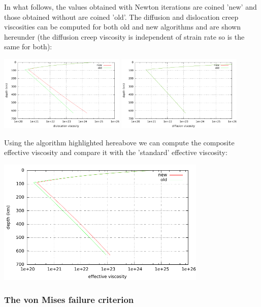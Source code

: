 In what follows, the values obtained with Newton iterations are coined 'new'
and those obtained without are coined 'old'.
The diffusion and dislocation creep viscosities can be
computed for both old and new algorithms and are shown hereunder
(the diffusion creep viscosity is independent of strain rate so
is the same for both):
\begin{center}
\includegraphics[width=6cm]{images/rheology/effvisc/both_mu_ds.pdf}
\includegraphics[width=6cm]{images/rheology/effvisc/both_mu_df.pdf}
\end{center}

Using the algorithm highlighted hereabove we can compute the
composite effective viscosity and compare it with the 'standard'
effective viscosity:
\begin{center}
\includegraphics[width=10cm]{images/rheology/effvisc/both_mueff.pdf}
\end{center}


\subsubsection{The von Mises failure criterion}\label{sec:vMcriterion}


